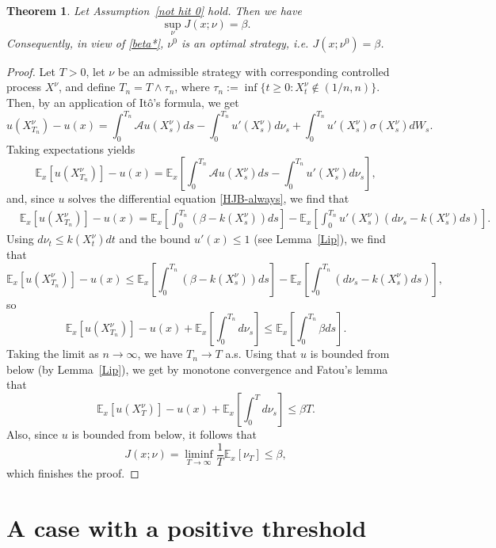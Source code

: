 \documentclass[12pt]{article}
\newtheorem{theorem}{Theorem}[section]
\begin{document}
\begin{theorem}\label{verification-always}
Let Assumption~\ref{not hit 0} hold. 
    Then we have 
    \[\sup_\nu J(x;\nu) =\beta.\]
Consequently, in view of \eqref{beta*}, $\nu^0$ is an optimal strategy, i.e. $J(x;\nu^0)=\beta$.
\end{theorem}


\begin{proof}
     Let $T > 0$, let $\nu$ be an admissible strategy with  corresponding controlled process $X^\nu$, and define 
     $T_n=T\wedge\tau_n$, where $\tau_n := \inf \{ t\geq 0: X^\nu_t \notin (1/n,n) \}$. Then, by an application of It\^o's formula, 
     we get
    \[
    u(X^\nu_{T_n}) - u(x) = \int_0^{T_n} \mathcal{A}u(X^\nu_s) ds - \int_0^{T_n} u'(X^\nu_s) d\nu_s + \int_0^{T_n} u'(X^\nu_s)\sigma(X^\nu_s) dW_s.
    \]
    Taking expectations yields
    \[
        \mathbb{E}_x [u(X^\nu_{T_n}) ] - u(x) = \mathbb{E}_x \left[ \int_0^{T_n} \mathcal{A}u(X^\nu_s) ds - \int_0^{T_n} u'(X^\nu_s) d\nu_s \right],
    \]
    and, since $u$ solves the differential equation \eqref{HJB-always}, we find that
    \begin{align*}
        & \mathbb{E}_x [u(X^\nu_{T_n})] - u(x) 
         = \mathbb{E}_x\left[\int_0^{T_n} (\beta - k(X^\nu_s))ds \right] - \mathbb{E}_x\left[\int_0^{T_n}u'(X^\nu_s)( d\nu_s - k(X^\nu_s)ds ) \right].
    \end{align*}
    Using $d\nu_t \leq k(X^\nu_t) dt$ and the bound $u'(x) \leq 1$ (see Lemma~\ref{Lip}), we find that
    \[ \mathbb{E}_x [u(X^\nu_{T_n})] - u(x) 
         \leq \mathbb{E}_x \left[ \int_0^{T_n} (\beta - k(X^\nu_s))ds \right] - \mathbb{E}_x \left[\int_0^{T_n}( d\nu_s - k(X^\nu_s)ds ) \right],
    \]
    so
    \[
    \mathbb{E}_x [u(X^\nu_{T_n})] - u(x) + \mathbb{E}_x \left[\int_0^{T_n} d\nu_s \right] \leq \mathbb{E}_x \left[\int_0^{T_n} \beta ds \right].
    \]
    Taking the limit as $n\to\infty$, we have $T_n\to T$ a.s. Using that $u$ is bounded from below (by Lemma~\ref{Lip}), we get by monotone convergence and Fatou's lemma that
    \[    \mathbb{E}_x [u(X^\nu_{T}) ] - u(x) + \mathbb{E}_x \left[\int_0^{T} d\nu_s \right] \leq \beta T.
    \]
    Also, since $u$ is bounded from below, it follows that
    \[J(x;\nu)=\liminf_{T\to\infty}\frac{1}{T}\mathbb E_x[\nu_T]\leq \beta,\]    
    which finishes the proof.
\end{proof}




\section{A case with a positive threshold}
\label{b>0}
\end{document}
